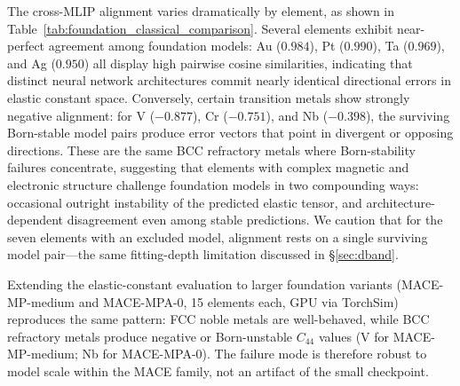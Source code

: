 \documentclass[twocolumn,10pt]{article}
\begin{document}
The cross-MLIP alignment varies dramatically by element, as shown in Table~\ref{tab:foundation_classical_comparison}. Several elements exhibit near-perfect agreement among foundation models: Au ($0.984$), Pt ($0.990$), Ta ($0.969$), and Ag ($0.950$) all display high pairwise cosine similarities, indicating that distinct neural network architectures commit nearly identical directional errors in elastic constant space. Conversely, certain transition metals show strongly negative alignment: for V ($-0.877$), Cr ($-0.751$), and Nb ($-0.398$), the surviving Born-stable model pairs produce error vectors that point in divergent or opposing directions. These are the same BCC refractory metals where Born-stability failures concentrate, suggesting that elements with complex magnetic and electronic structure challenge foundation models in two compounding ways: occasional outright instability of the predicted elastic tensor, and architecture-dependent disagreement even among stable predictions. We caution that for the seven elements with an excluded model, alignment rests on a single surviving model pair---the same fitting-depth limitation discussed in \S\ref{sec:dband}.

Extending the elastic-constant evaluation to larger foundation variants (MACE-MP-medium and MACE-MPA-0, 15 elements each, GPU via TorchSim) reproduces the same pattern: FCC noble metals are well-behaved, while BCC refractory metals produce negative or Born-unstable $C_{44}$ values (V for MACE-MP-medium; Nb for MACE-MPA-0). The failure mode is therefore robust to model scale within the MACE family, not an artifact of the small checkpoint.
\end{document}
